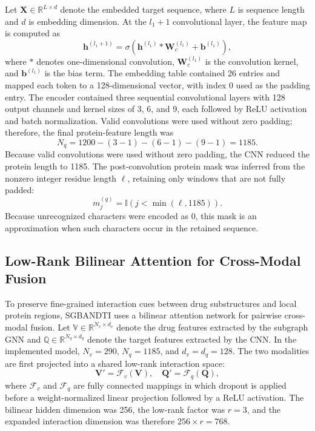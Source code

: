 \documentclass[computers,article,submit,moreauthors]{Definitions/mdpi}
\begin{document}
Let $\mathbf{X} \in \mathbb{R}^{L \times d}$ denote the embedded target sequence, where $L$ is sequence length and $d$ is embedding dimension. At the $l_1 + 1$ convolutional layer, the feature map is computed as
\begin{equation}
\mathbf{h}^{(l_1+1)} = \sigma \left( \mathbf{h}^{(l_1)} * \mathbf{W}_c^{(l_1)} + \mathbf{b}^{(l_1)} \right),
\end{equation}
where $*$ denotes one-dimensional convolution, $\mathbf{W}_c^{(l_1)}$ is the convolution kernel, and $\mathbf{b}^{(l_1)}$ is the bias term. The embedding table contained 26 entries and mapped each token to a 128-dimensional vector, with index 0 used as the padding entry. The encoder contained three sequential convolutional layers with 128 output channels and kernel sizes of 3, 6, and 9, each followed by ReLU activation and batch normalization. Valid convolutions were used without zero padding; therefore, the final protein-feature length was
\begin{equation}
N_q = 1200 - (3-1) - (6-1) - (9-1) = 1185.
\end{equation}
Because valid convolutions were used without zero padding, the CNN reduced the protein length to 1185. The post-convolution protein mask was inferred from the nonzero integer residue length $\ell$, retaining only windows that are not fully padded:
\begin{equation}
m_j^{(q)} = \mathbb{I}\left(j < \min(\ell,1185)\right).
\end{equation}
Because unrecognized characters were encoded as 0, this mask is an approximation when such characters occur in the retained sequence.

\subsection{Low-Rank Bilinear Attention for Cross-Modal Fusion}
To preserve fine-grained interaction cues between drug substructures and local protein regions, SGBANDTI uses a bilinear attention network for pairwise cross-modal fusion. Let $\mathbb{V} \in \mathbb{R}^{N_v \times d_v}$ denote the drug features extracted by the subgraph GNN and $\mathbb{Q} \in \mathbb{R}^{N_q \times d_q}$ denote the target features extracted by the CNN. In the implemented model, $N_v=290$, $N_q=1185$, and $d_v=d_q=128$. The two modalities are first projected into a shared low-rank interaction space:
\begin{equation}
\mathbf{V}' = \mathcal{F}_v(\mathbf{V}), \quad \mathbf{Q}' = \mathcal{F}_q(\mathbf{Q}),
\end{equation}
where $\mathcal{F}_v$ and $\mathcal{F}_q$ are fully connected mappings in which dropout is applied before a weight-normalized linear projection followed by a ReLU activation. The bilinear hidden dimension was 256, the low-rank factor was $r=3$, and the expanded interaction dimension was therefore $256 \times r = 768$.
\end{document}

